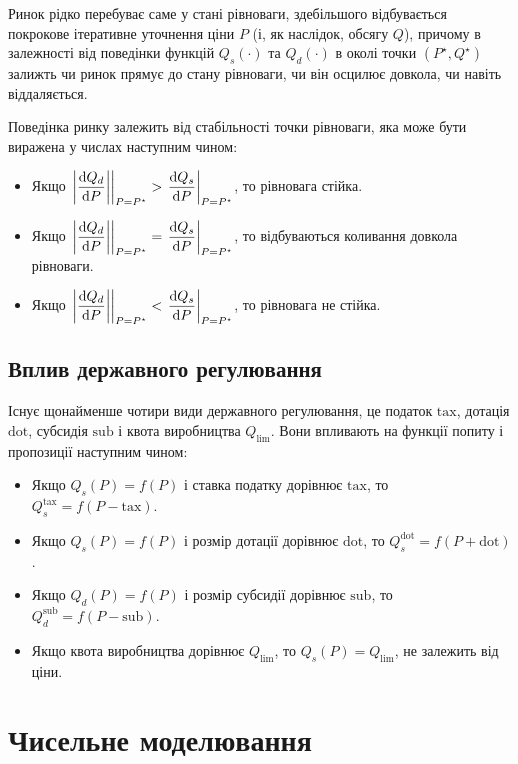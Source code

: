 Ринок рідко перебуває саме у стані рівноваги, здебільшого відбувається покрокове ітеративне уточнення ціни $P$ (і, як наслідок, обсягу $Q$), причому в залежності від поведінки функцій $Q_s(\cdot)$ та $Q_d(\cdot)$ в околі точки $(P^\star, Q^\star)$ залижть чи ринок прямує до стану рівноваги, чи він осцилює довкола, чи навіть віддаляється. \medskip

Поведінка ринку залежить від стабільності точки рівноваги, яка може бути виражена у числах наступним чином:
\begin{itemize}
	\item Якщо $\left. \left| \dfrac{\mathop{}\!\mathrm{d} Q_d}{\mathop{}\!\mathrm{d} P} \right| \right|_{P = P^\star} > \left. \dfrac{\mathop{}\!\mathrm{d} Q_s}{\mathop{}\!\mathrm{d} P} \right|_{P = P^\star}$, то рівновага стійка.
	\item Якщо $\left. \left| \dfrac{\mathop{}\!\mathrm{d} Q_d}{\mathop{}\!\mathrm{d} P} \right| \right|_{P = P^\star} = \left. \dfrac{\mathop{}\!\mathrm{d} Q_s}{\mathop{}\!\mathrm{d} P} \right|_{P = P^\star}$, то відбуваються коливання довкола рівноваги.
	\item Якщо $\left. \left| \dfrac{\mathop{}\!\mathrm{d} Q_d}{\mathop{}\!\mathrm{d} P} \right| \right|_{P = P^\star} < \left. \dfrac{\mathop{}\!\mathrm{d} Q_s}{\mathop{}\!\mathrm{d} P} \right|_{P = P^\star}$, то рівновага не стійка.
\end{itemize}

\subsection{Вплив державного регулювання}

Існує щонайменше чотири види державного регулювання, це податок $\text{tax}$, дотація $\text{dot}$, субсидія $\text{sub}$ і квота виробництва $Q_{\text{lim}}$. Вони впливають на функції попиту і пропозиції наступним чином:
\begin{itemize}
	\item Якщо $Q_s(P) = f(P)$ і ставка податку дорівнює $\text{tax}$, то $Q_s^\text{tax} = f(P - \text{tax})$.
	\item Якщо $Q_s(P) = f(P)$ і розмір дотації дорівнює $\text{dot}$, то $Q_s^\text{dot} = f(P + \text{dot})$.
	\item Якщо $Q_d(P) = f(P)$ і розмір субсидії дорівнює $\text{sub}$, то $Q_d^\text{sub} = f(P - \text{sub})$.
	\item Якщо квота виробництва дорівнює $Q_\text{lim}$, то $Q_s(P) = Q_{\text{lim}}$, не залежить від ціни.
\end{itemize}

\section{Чисельне моделювання}

